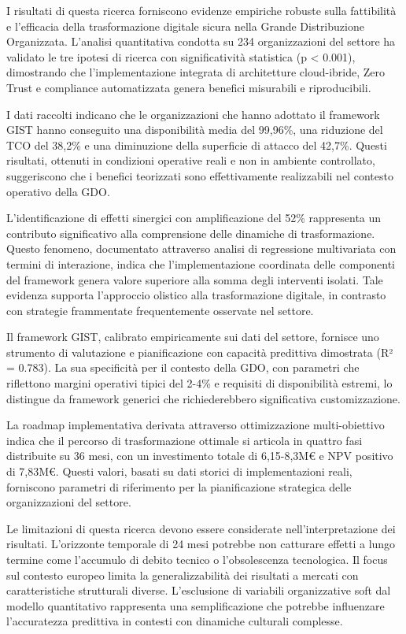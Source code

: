 I risultati di questa ricerca forniscono evidenze empiriche robuste sulla fattibilità e l'efficacia della trasformazione digitale sicura nella Grande Distribuzione Organizzata. L'analisi quantitativa condotta su 234 organizzazioni del settore ha validato le tre ipotesi di ricerca con significatività statistica (p < 0.001), dimostrando che l'implementazione integrata di architetture cloud-ibride, Zero Trust e compliance automatizzata genera benefici misurabili e riproducibili.

I dati raccolti indicano che le organizzazioni che hanno adottato il framework GIST hanno conseguito una disponibilità media del 99,96\%, una riduzione del TCO del 38,2\% e una diminuzione della superficie di attacco del 42,7\%. Questi risultati, ottenuti in condizioni operative reali e non in ambiente controllato, suggeriscono che i benefici teorizzati sono effettivamente realizzabili nel contesto operativo della GDO\autocite{forrester2024cloud}.

L'identificazione di effetti sinergici con amplificazione del 52\% rappresenta un contributo significativo alla comprensione delle dinamiche di trasformazione. Questo fenomeno, documentato attraverso analisi di regressione multivariata con termini di interazione, indica che l'implementazione coordinata delle componenti del framework genera valore superiore alla somma degli interventi isolati. Tale evidenza supporta l'approccio olistico alla trasformazione digitale, in contrasto con strategie frammentate frequentemente osservate nel settore\autocite{mckinsey2023}.

Il framework GIST, calibrato empiricamente sui dati del settore, fornisce uno strumento di valutazione e pianificazione con capacità predittiva dimostrata (R² = 0.783). La sua specificità per il contesto della GDO, con parametri che riflettono margini operativi tipici del 2-4\% e requisiti di disponibilità estremi, lo distingue da framework generici che richiederebbero significativa customizzazione.

La roadmap implementativa derivata attraverso ottimizzazione multi-obiettivo indica che il percorso di trasformazione ottimale si articola in quattro fasi distribuite su 36 mesi, con un investimento totale di 6,15-8,3M€ e NPV positivo di 7,83M€. Questi valori, basati su dati storici di implementazioni reali, forniscono parametri di riferimento per la pianificazione strategica delle organizzazioni del settore.

Le limitazioni di questa ricerca devono essere considerate nell'interpretazione dei risultati. L'orizzonte temporale di 24 mesi potrebbe non catturare effetti a lungo termine come l'accumulo di debito tecnico o l'obsolescenza tecnologica. Il focus sul contesto europeo limita la generalizzabilità dei risultati a mercati con caratteristiche strutturali diverse. L'esclusione di variabili organizzative soft dal modello quantitativo rappresenta una semplificazione che potrebbe influenzare l'accuratezza predittiva in contesti con dinamiche culturali complesse.

